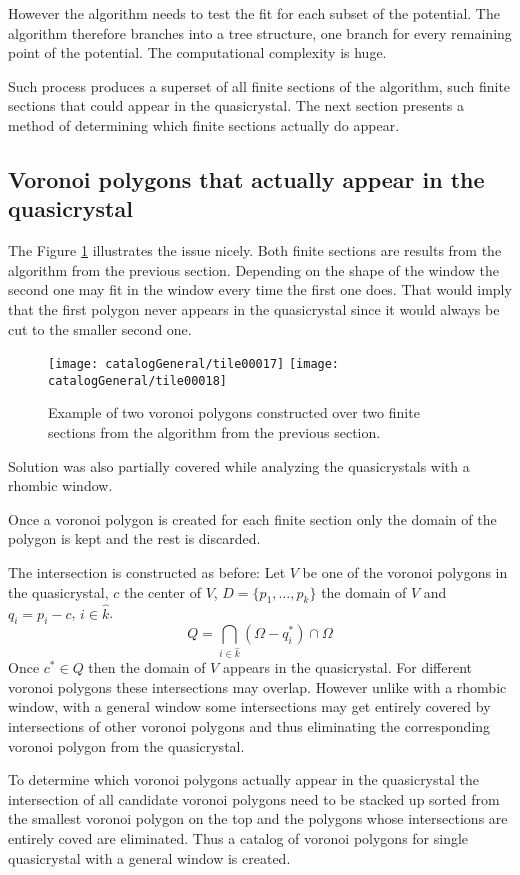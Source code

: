 \documentclass[text.tex]{subfiles}
\begin{document}
However the algorithm needs to test the fit for each subset of the potential. The algorithm therefore branches into a tree structure, one branch for every remaining point of the potential. The computational complexity is huge. 

Such process produces a superset of all finite sections of the algorithm, such finite sections that could appear in the quasicrystal. The next section presents a method of determining which finite sections actually do appear. 

\subsection{Voronoi polygons that actually appear in the quasicrystal}
The Figure \ref{fig:twoTiles} illustrates the issue nicely. Both finite sections are results from the algorithm from the previous section. Depending on the shape of the window the second one may fit in the window every time the first one does. That would imply that the first polygon never appears in the quasicrystal since it would always be cut to the smaller second one. 
\begin{figure}[h!]
\centering
\texttt{[image: catalogGeneral/tile00017]}%
\qquad%
\texttt{[image: catalogGeneral/tile00018]}
\caption{Example of two voronoi polygons constructed over two finite sections from the algorithm from the previous section.}
\label{fig:twoTiles}
\end{figure}

Solution was also partially covered while analyzing the quasicrystals with a rhombic window. 

Once a voronoi polygon is created for each finite section only the domain of the polygon is kept and the rest is discarded. 

The intersection is constructed as before:
Let $V$ be one of the voronoi polygons in the quasicrystal, $c$ the center of $V$, $D = \{p_1,\dots,p_k\}$ the domain of $V$ and $q_i = p_i - c$, $i\in\hat{k}$.
$$Q = \bigcap\limits_{i\in\hat{k}}(\Omega-q_i^\ast)\cap\Omega$$
Once $c^\ast\in Q$ then the domain of $V$ appears in the quasicrystal. For different voronoi polygons these intersections may overlap. However unlike with a rhombic window, with a general window some intersections may get entirely covered by intersections of other voronoi polygons and thus eliminating the corresponding voronoi polygon from the quasicrystal. 

To determine which voronoi polygons actually appear in the quasicrystal the intersection of all candidate voronoi polygons need to be stacked up sorted from the smallest voronoi polygon on the top and the polygons whose intersections are entirely coved are eliminated. Thus a catalog of voronoi polygons for single quasicrystal with a general window is created. 
\end{document}
